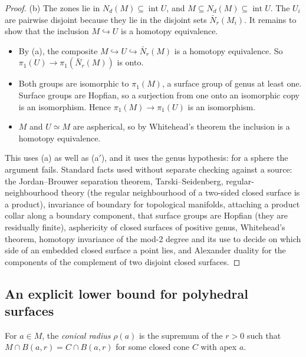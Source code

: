 \documentclass[preprint,12pt]{elsarticle}
\theoremstyle{definition}
\theoremstyle{remark}
\newcommand{\inter}{\operatorname{int}}
\begin{document}
\begin{proof}
(b) The zones lie in $N_d(M)\subseteq\inter U$, and $M\subseteq N_d(M)\subseteq\inter U$. The $U_i$ are pairwise
disjoint because they lie in the disjoint sets $\bar N_r(M_i)$. It remains to show that the inclusion
$M\hookrightarrow U$ is a homotopy equivalence.
\begin{itemize}
\item By (a), the composite $M\hookrightarrow U\hookrightarrow\bar N_r(M)$ is a homotopy equivalence. So
$\pi_1(U)\to\pi_1(\bar N_r(M))$ is onto.
\item Both groups are isomorphic to $\pi_1(M)$, a surface group of genus at least one. Surface groups are Hopfian,
so a surjection from one onto an isomorphic copy is an isomorphism. Hence $\pi_1(M)\to\pi_1(U)$ is an isomorphism.
\item $M$ and $U\simeq M$ are aspherical, so by Whitehead's theorem the inclusion is a homotopy equivalence.
\end{itemize}
This uses (a) as well as (a$'$), and it uses the genus hypothesis: for a sphere the argument fails.
Standard facts used without separate checking against a source: the Jordan--Brouwer separation theorem,
Tarski--Seidenberg, regular-neighbourhood theory (the regular neighbourhood of a two-sided closed surface is a product),
invariance of boundary for topological manifolds, attaching a product collar along a boundary component, that surface
groups are Hopfian (they are residually finite), asphericity of closed surfaces of positive genus, Whitehead's
theorem, homotopy invariance of the mod-2 degree and its use to decide on which side of an embedded closed surface a
point lies, and Alexander duality for the components of the complement of two disjoint closed surfaces.
\end{proof}

\subsection{An explicit lower bound for polyhedral surfaces}
For $a\in M$, the \emph{conical radius} $\rho(a)$ is the supremum of the $r>0$ such that $M\cap B(a,r)=C\cap
B(a,r)$ for some closed cone $C$ with apex $a$.
\end{document}
